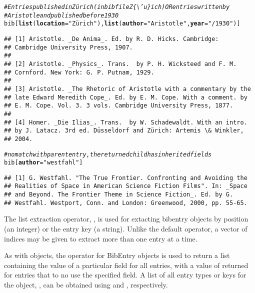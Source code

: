 \documentclass[article]{jss}\usepackage[]{graphicx}\usepackage[]{color}
\makeatletter
\newcommand{\hlstr}[1]{\textcolor[rgb]{0.125,0.125,1}{#1}}%
\newcommand{\hlcom}[1]{\textcolor[rgb]{1,0,0.753}{\textit{#1}}}%
\newcommand{\hlstd}[1]{\textcolor[rgb]{0.251,0.251,0.282}{#1}}%
\newcommand{\hlkwc}[1]{\textcolor[rgb]{0.529,0,0.184}{\textbf{#1}}}%
\newcommand{\hlkwd}[1]{\textcolor[rgb]{0.251,0.251,0.282}{\textbf{#1}}}%
\newenvironment{kframe}{%
 \def\at@end@of@kframe{}%
 \ifinner\ifhmode%
  \def\at@end@of@kframe{\end{minipage}}%
  \begin{minipage}{\columnwidth}%
 \fi\fi%
 \def\FrameCommand##1{\hskip\@totalleftmargin \hskip-\fboxsep
 \colorbox{shadecolor}{##1}\hskip-\fboxsep
     \hskip-\linewidth \hskip-\@totalleftmargin \hskip\columnwidth}%
 \MakeFramed {\advance\hsize-\width
   \@totalleftmargin\z@ \linewidth\hsize
   \@setminipage}}%
 {\par\unskip\endMakeFramed%
 \at@end@of@kframe}
\newenvironment{knitrout}{}{} %
\makeatother
\begin{document}
\begin{knitrout}
\color{fgcolor}\begin{kframe}
\begin{alltt}
\hlcom{# Entries published in Zürich (in bib file Z\{\textbackslash{}'u\}ich) OR entries written by}
\hlcom{# Aristotle and published before 1930}
\hlstd{bib[}\hlkwd{list}\hlstd{(}\hlkwc{location} \hlstd{=} \hlstr{"Zürich"}\hlstd{),} \hlkwd{list}\hlstd{(}\hlkwc{author} \hlstd{=} \hlstr{"Aristotle"}\hlstd{,} \hlkwc{year} \hlstd{=} \hlstr{"/1930"}\hlstd{)]}
\end{alltt}
\begin{verbatim}
## [1] Aristotle. _De Anima_. Ed. by R. D. Hicks. Cambridge:
## Cambridge University Press, 1907.
## 
## [2] Aristotle. _Physics_. Trans.  by P. H. Wicksteed and F. M.
## Cornford. New York: G. P. Putnam, 1929.
## 
## [3] Aristotle. _The Rhetoric of Aristotle with a commentary by the
## late Edward Meredith Cope_. Ed. by E. M. Cope. With a comment. by
## E. M. Cope. Vol. 3. 3 vols. Cambridge University Press, 1877.
## 
## [4] Homer. _Die Ilias_. Trans.  by W. Schadewaldt. With an intro.
## by J. Latacz. 3rd ed. Düsseldorf and Zürich: Artemis \& Winkler,
## 2004.
\end{verbatim}
\begin{alltt}
\hlcom{# no match with parent entry, the returned child has inherited fields}
\hlstd{bib[}\hlkwc{author} \hlstd{=} \hlstr{"westfahl"}\hlstd{]}
\end{alltt}
\begin{verbatim}
## [1] G. Westfahl. "The True Frontier. Confronting and Avoiding the
## Realities of Space in American Science Fiction Films". In: _Space
## and Beyond. The Frontier Theme in Science Fiction_. Ed. by G.
## Westfahl. Westport, Conn. and London: Greenwood, 2000, pp. 55-65.
\end{verbatim}
\end{kframe}
\end{knitrout}

The list extraction operator, \code{`[[`}, is used for extacting bibentry objects by position (an integer) or the entry key (a string).  Unlike the default operator, a vector of indices may be given to extract more than one entry at a time.

As with  objects, the  operator for BibEntry objects is used to return a list containing the value of a particular field for all entries, with a value of  returned for entries that to no use the specified field.  A list of all entry types or keys for the  object, , can be obtained using  and , respectively.
\end{document}
